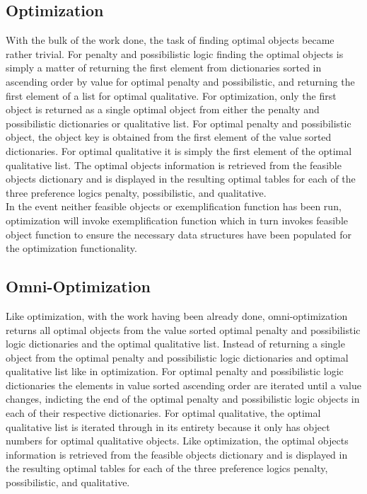 \documentclass[12pt]{report}
\begin{document}
\subsection{Optimization}
With the bulk of the work done, the task of finding optimal objects became rather trivial. For penalty and possibilistic logic finding the optimal objects is simply a matter of returning the first element from dictionaries sorted in ascending order by value for optimal penalty and possibilistic, and returning the first element of a list for optimal qualitative. For optimization, only the first object is returned as a single optimal object from either the penalty and possibilistic dictionaries or qualitative list. For optimal penalty and possibilistic object, the object key is obtained from the first element of the value sorted dictionaries. For optimal qualitative it is simply the first element of the optimal qualitative list. The optimal objects information is retrieved from the feasible objects dictionary and is displayed in the resulting optimal tables for each of the three preference logics penalty, possibilistic, and qualitative.\\

In the event neither feasible objects or exemplification function has been run, optimization will invoke exemplification function which in turn invokes feasible object function to ensure the necessary data structures have been populated for the optimization functionality. 

\subsection{Omni-Optimization}
Like optimization, with the work having been already done, omni-optimization returns all optimal objects from the value sorted optimal penalty and possibilistic logic dictionaries and the optimal qualitative list. Instead of returning a single object from the optimal penalty and possibilistic logic dictionaries and optimal qualitative list like in optimization. For optimal penalty and possibilistic logic dictionaries the elements in value sorted ascending order are iterated until a value changes, indicting the end of the optimal penalty and possibilistic logic objects in each of their respective dictionaries. For optimal qualitative, the optimal qualitative list is iterated through in its entirety because it only has object numbers for optimal qualitative objects. Like optimization, the optimal objects information is retrieved from the feasible objects dictionary and is displayed in the resulting optimal tables for each of the three preference logics penalty, possibilistic, and qualitative.\\
\end{document}
